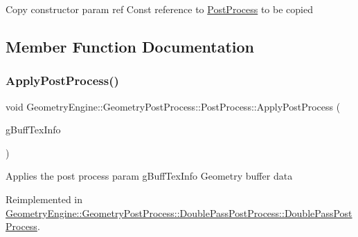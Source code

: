 Copy constructor param ref Const reference to \mbox{\hyperlink{class_geometry_engine_1_1_geometry_post_process_1_1_post_process}{Post\+Process}} to be copied 

\subsection{Member Function Documentation}
\mbox{\label{class_geometry_engine_1_1_geometry_post_process_1_1_post_process_a2dbb157265ebdeea658982673e757d46}} 
\subsubsection{\texorpdfstring{ApplyPostProcess()}{ApplyPostProcess()}}
{\footnotesize\ttfamily void Geometry\+Engine\+::\+Geometry\+Post\+Process\+::\+Post\+Process\+::\+Apply\+Post\+Process (\begin{DoxyParamCaption}\item[{const \mbox{\hyperlink{class_geometry_engine_1_1_g_buffer_texture_info}{G\+Buffer\+Texture\+Info}} \&}]{g\+Buff\+Tex\+Info }\end{DoxyParamCaption})\hspace{0.3cm}{\ttfamily [virtual]}}

Applies the post process param g\+Buff\+Tex\+Info Geometry buffer data 

Reimplemented in \mbox{\hyperlink{class_geometry_engine_1_1_geometry_post_process_1_1_double_pass_post_process_1_1_double_pass_post_process_a9d2674bc5b237ed2e494d1c88f63d29e}{Geometry\+Engine\+::\+Geometry\+Post\+Process\+::\+Double\+Pass\+Post\+Process\+::\+Double\+Pass\+Post\+Process}}.

\mbox{\label{class_geometry_engine_1_1_geometry_post_process_1_1_post_process_a3657f263948ecee70314c859e15412e1}} 
